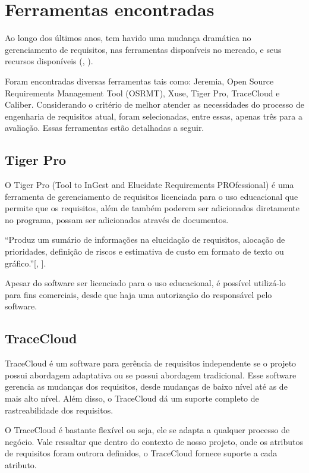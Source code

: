 \section[Ferramentas encontradas]{Ferramentas encontradas}
Ao longo dos últimos anos, tem havido uma mudança dramática no gerenciamento de requisitos, nas ferramentas disponíveis no mercado, e seus recursos disponíveis (\citeauthor{beatty}, \citeyear{beatty}).

Foram encontradas diversas ferramentas tais como: Jeremia, Open Source Requirements Management Tool (OSRMT), Xuse, Tiger Pro, TraceCloud e Caliber. Considerando o critério de melhor atender as necessidades do processo de engenharia de requisitos atual, foram selecionadas, entre essas, apenas três para a avaliação. Essas ferramentas estão detalhadas a seguir.


\subsection{Tiger Pro}
O Tiger Pro (Tool to InGest and Elucidate Requirements PROfessional) é uma ferramenta de gerenciamento de requisitos licenciada para o uso educacional que permite que os requisitos, além de também poderem ser adicionados diretamente no programa, possam ser adicionados através de documentos.

“Produz um sumário de informações na elucidação de requisitos, alocação de prioridades, definição de riscos e estimativa de custo em formato de texto ou gráfico.”[\citeauthor{ananias}, \citeyear{ananias}].

Apesar do software ser licenciado para o uso educacional, é possível utilizá-lo para fins comerciais, desde que haja uma autorização do responsável pelo software.

\subsection{TraceCloud}
TraceCloud é um software para gerência de requisitos independente se o projeto possui abordagem adaptativa ou se possui abordagem tradicional. Esse software gerencia as mudanças dos requisitos, desde mudanças de baixo nível até as de mais alto nível. Além disso, o TraceCloud dá um suporte completo de rastreabilidade dos requisitos.

O TraceCloud é bastante flexível ou seja, ele se adapta a qualquer processo de negócio. Vale ressaltar que dentro do contexto de nosso projeto, onde os atributos de requisitos foram outrora definidos, o TraceCloud fornece suporte a cada atributo.

